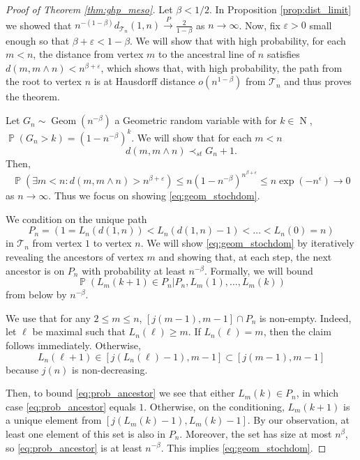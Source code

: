 \documentclass[10pt,a4paper]{amsart}
\DeclareMathOperator{\N}{N}
\newcommand{\cT}{\mathcal{T}}\newcommand{\cU}{\mathcal{U}}
\newcommand{\convp}{\stackrel{P}{\longrightarrow}}
\renewcommand{\ge}{\geqslant}
\renewcommand{\le}{\leqslant}
\DeclareMathOperator{\pr}{\mathds{P}}
\begin{document}
\begin{proof}[Proof of Theorem \ref{thm:ghp_meso}]
Let $\beta<1/2$. In Proposition \ref{prop:dist_limit} we showed that $n^{-(1-\beta)}d_{\mathcal{T}_n}(1,n)\convp \frac{2}{1-\beta}$ as $n\to\infty$.
Now, fix $\varepsilon>0$ small enough so that $\beta+\varepsilon<1-\beta$. We will show that with high probability, for each $m<n$, the distance from vertex $m$ to the ancestral line of $n$ satisfies $d(m,m\wedge n)<n^{\beta+\varepsilon}$, which shows that, with high probability, the path from the root to vertex $n$ is at Hausdorff distance $o(n^{1-\beta})$ from $\cT_n$ and thus proves the theorem. 

Let $G_n\sim \operatorname{Geom}(n^{-\beta})$ a Geometric random variable with for $k\in \N$, $\pr(G_n>k)=(1-n^{-\beta})^k$. We will show that for each $m<n$ \begin{equation}\label{eq:geom_stochdom}d(m,m\wedge n)\prec_{st}G_n+1.\end{equation} 
Then, 
\[\pr\left(\exists m<n: d(m,m\wedge n)>n^{\beta+\varepsilon} \right) \le n (1-n^{-\beta})^{n^{\beta+\epsilon}}\le n\exp(-n^\epsilon)\to 0\]
as $n\to \infty$. Thus we focus on showing \eqref{eq:geom_stochdom}. 

We condition on the unique path
\[P_n=(1=L_n(d(1,n))<L_n(d(1,n)-1)<\dots< L_n(0)=n)\] in $\mathcal{T}_n$ from vertex $1$ to vertex $n$. We will show \eqref{eq:geom_stochdom} by iteratively revealing the ancestors of vertex $m$ and showing that, at each step, the next ancestor is on $P_n$ with probability at least $n^{-\beta}$. Formally, we will bound
\begin{equation}\label{eq:prob_ancestor} \pr(L_m(k+1)\in P_n | P_n, L_m(1), \dots, L_m(k))\end{equation}
from below by $n^{-\beta}$.

We use that for any $2\le m\le n$, $[j(m-1), m-1]\cap P_n$ is non-empty. Indeed, let $\ell$ be maximal such that $L_n(\ell)\ge m$. If $L_n(\ell)=m$, then the claim follows immediately. Otherwise, \[L_n(\ell+1)\in [j(L_n(\ell)-1) ,  m-1]\subset [j(m-1), m-1]  \] because $j(n)$ is non-decreasing. 

Then, to bound \eqref{eq:prob_ancestor} we see that either $L_m(k)\in P_n$, in which case \eqref{eq:prob_ancestor} equals $1$. Otherwise, on the conditioning, $L_m(k+1)$ is a unique element from $[j(L_m(k)-1), L_m(k)-1]$. By our observation, at least one element of this set is also in $P_n$. Moreover, the set has size at most $n^{\beta}$, so \eqref{eq:prob_ancestor} is at least $n^{-\beta}$. This implies \eqref{eq:geom_stochdom}. 

\end{proof}
\end{document}

